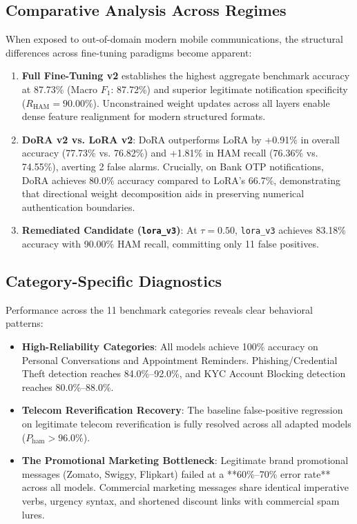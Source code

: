 \documentclass[conference]{IEEEtran}
\begin{document}
\subsection{Comparative Analysis Across Regimes}
When exposed to out-of-domain modern mobile communications, the structural differences across fine-tuning paradigms become apparent:
\begin{enumerate}
    \item \textbf{Full Fine-Tuning v2} establishes the highest aggregate benchmark accuracy at 87.73\% (Macro $F_1$: 87.72\%) and superior legitimate notification specificity ($R_{\text{HAM}} = 90.00\%$). Unconstrained weight updates across all layers enable dense feature realignment for modern structured formats.
    \item \textbf{DoRA v2 vs. LoRA v2}: DoRA outperforms LoRA by +0.91\% in overall accuracy (77.73\% vs. 76.82\%) and +1.81\% in HAM recall (76.36\% vs. 74.55\%), averting 2 false alarms. Crucially, on Bank OTP notifications, DoRA achieves 80.0\% accuracy compared to LoRA's 66.7\%, demonstrating that directional weight decomposition aids in preserving numerical authentication boundaries.
    \item \textbf{Remediated Candidate (\texttt{lora\_v3})}: At $\tau = 0.50$, \texttt{lora\_v3} achieves 83.18\% accuracy with 90.00\% HAM recall, committing only 11 false positives.
\end{enumerate}

\subsection{Category-Specific Diagnostics}
Performance across the 11 benchmark categories reveals clear behavioral patterns:
\begin{itemize}
    \item \textbf{High-Reliability Categories}: All models achieve 100\% accuracy on Personal Conversations and Appointment Reminders. Phishing/Credential Theft detection reaches 84.0\%--92.0\%, and KYC Account Blocking detection reaches 80.0\%--88.0\%.
    \item \textbf{Telecom Reverification Recovery}: The baseline false-positive regression on legitimate telecom reverification is fully resolved across all adapted models ($P_{\text{ham}} > 96.0\%$).
    \item \textbf{The Promotional Marketing Bottleneck}: Legitimate brand promotional messages (Zomato, Swiggy, Flipkart) failed at a **60\%--70\% error rate** across all models. Commercial marketing messages share identical imperative verbs, urgency syntax, and shortened discount links with commercial spam lures.
\end{itemize}
\end{document}
